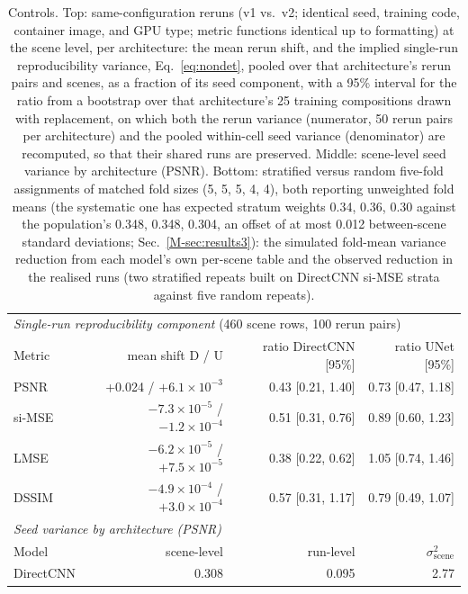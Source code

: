 \begin{table}[!htb]\centering\caption{Controls. Top: same-configuration reruns (v1 vs.\ v2; identical seed, training code, container image, and GPU type; metric functions identical up to formatting) at the scene level, per architecture: the mean rerun shift, and the implied single-run reproducibility variance, Eq.~\eqref{eq:nondet}, pooled over that architecture's rerun pairs and scenes, as a fraction of its seed component, with a 95\% interval for the ratio from a bootstrap over that architecture's 25 training compositions drawn with replacement, on which both the rerun variance (numerator, 50 rerun pairs per architecture) and the pooled within-cell seed variance (denominator) are recomputed, so that their shared runs are preserved. Middle: scene-level seed variance by architecture (PSNR). Bottom: stratified versus random five-fold assignments of matched fold sizes (5, 5, 5, 4, 4), both reporting unweighted fold means (the systematic one has expected stratum weights 0.34, 0.36, 0.30 against the population's 0.348, 0.348, 0.304, an offset of at most 0.012 between-scene standard deviations; Sec.~\ref{M-sec:results3}): the simulated fold-mean variance reduction from each model's own per-scene table and the observed reduction in the realised runs (two stratified repeats built on DirectCNN si-MSE strata against five random repeats).}\label{tab:controls}
\footnotesize\setlength{\tabcolsep}{4pt}\begin{tabular}{lrrr}\toprule
\multicolumn{4}{l}{\textit{Single-run reproducibility component} (460 scene rows, 100 rerun pairs)}\\
Metric & mean shift D / U & ratio DirectCNN [95\%] & ratio UNet [95\%] \\\midrule
PSNR & +0.024 / $+6.1\times10^{-3}$ & 0.43 [0.21, 1.40] & 0.73 [0.47, 1.18] \\
si-MSE & $-7.3\times10^{-5}$ / $-1.2\times10^{-4}$ & 0.51 [0.31, 0.76] & 0.89 [0.60, 1.23] \\
LMSE & $-6.2\times10^{-5}$ / $+7.5\times10^{-5}$ & 0.38 [0.22, 0.62] & 1.05 [0.74, 1.46] \\
DSSIM & $-4.9\times10^{-4}$ / $+3.0\times10^{-4}$ & 0.57 [0.31, 1.17] & 0.79 [0.49, 1.07] \\
\midrule
\multicolumn{4}{l}{\textit{Seed variance by architecture (PSNR)}}\\
Model & scene-level & run-level & $\sigma^2_{\mathrm{scene}}$ \\\midrule
DirectCNN & 0.308 & 0.095 & 2.77 \\

\end{tabular}
\end{table}
